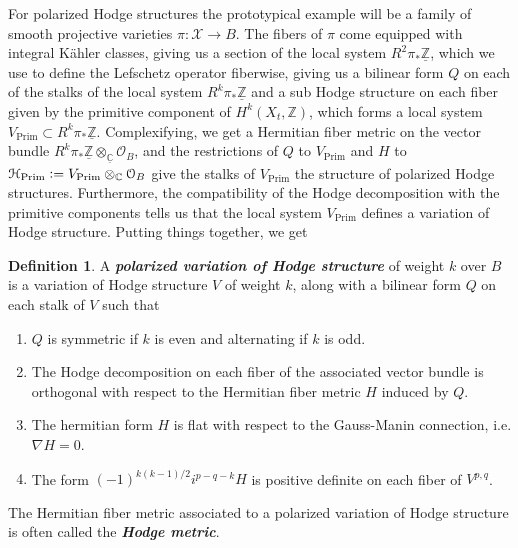 \documentclass[psamsfonts, 12pt]{amsart}
\theoremstyle{definition}
\newtheorem{defn}[thm]{Definition}
\theoremstyle{remark}
\renewcommand{\O}{\mathcal{O}}
\newcommand{\ib}[1]{\textbf{\textit{#1}}}
\newcommand{\Z}{\mathbb{Z}}
\newcommand{\C}{\mathbb{C}}
\newcommand{\defeq}{\vcentcolon=}
\begin{document}
For polarized Hodge structures the prototypical example will be a family of
smooth projective varieties $\pi : \mathcal{X} \to B$. The fibers of $\pi$
come equipped with integral K\"ahler classes, giving us a section
of the local system $R^2\pi_*\underline{\Z}$, which we use to define the
Lefschetz operator fiberwise, giving us a bilinear form $Q$ on each of the
stalks of the local system $R^k\pi_*\underline{\Z}$ and a sub Hodge structure
on each fiber given by the primitive component of $H^k(X_t,\Z)$, which forms
a local system $V_{\mathrm{Prim}} \subset R^k\pi_*\underline{\Z}$.
Complexifying, we get a Hermitian fiber metric on the vector bundle
$R^k\pi_*\underline{\Z} \otimes_{\underline{\C}} \O_B$, and the restrictions
of $Q$ to $V_{\mathrm{Prim}}$ and $H$ to
$\mathcal{H}_{\mathrm{Prim}} \defeq V_{\mathrm{Prim}} \otimes_{\C} \O_B$
give the stalks of $V_{\mathrm{Prim}}$ the structure of polarized Hodge
structures. Furthermore, the compatibility of the Hodge decomposition
with the primitive components tells us that the local system $V_{\mathrm{Prim}}$
defines a variation of Hodge structure. Putting things together, we get
%
\begin{defn}
A \ib{polarized variation of Hodge structure} of weight $k$ over $B$ is
a variation of Hodge structure $V$ of weight $k$, along with a bilinear form
$Q$ on each stalk of $V$ such that
\begin{enumerate}
  \item $Q$ is symmetric if $k$ is even and alternating if $k$ is odd.
  \item The Hodge decomposition on each fiber of the associated vector
  bundle is orthogonal with respect to the Hermitian fiber metric $H$ induced by $Q$.
  \item The hermitian form $H$ is flat with respect to the Gauss-Manin connection,
  i.e. $\nabla H = 0$.
  \item The form $(-1)^{k(k-1)/2}i^{p-q-k}H$ is positive definite on each
  fiber of $V^{p,q}$.
\end{enumerate}
\end{defn}
%
The Hermitian fiber metric associated to a polarized variation of Hodge structure is
often called the \ib{Hodge metric}.
%
\end{document}
